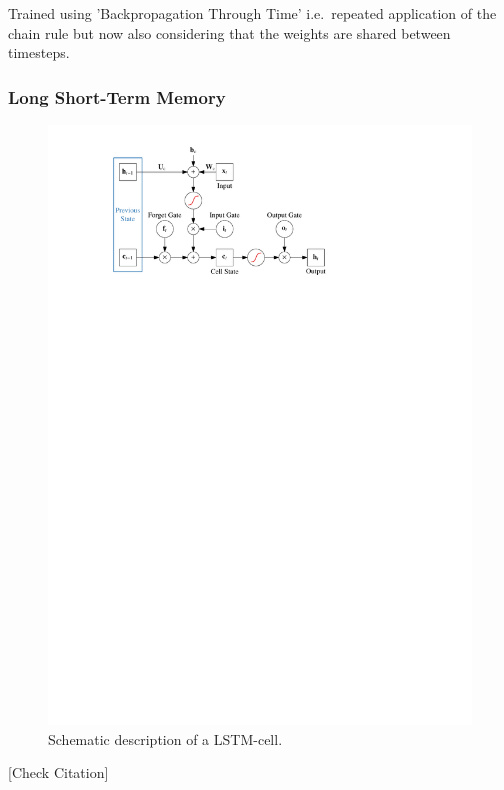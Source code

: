 Trained using 'Backpropagation Through Time' i.e.\ repeated application of the
chain rule but now also considering that the weights are shared between
timesteps.

\subsubsection{Long Short-Term Memory}
\label{sec:lstm}

\begin{figure}[t]
  \centering
  \includegraphics{./figures/theory/LSTM.pdf}
  \caption{Schematic description of a LSTM-cell.}
  \label{fig:schematic_lstm}
\end{figure}

[Check Citation]\cite{lstm}



